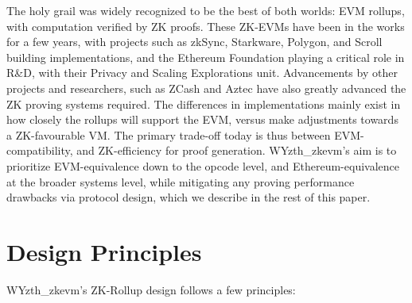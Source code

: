 \documentclass[9pt,oneside]{amsart}
\begin{document}
\begin{multicols}{2}
The holy grail was widely recognized to be the best of both worlds: EVM rollups, with computation verified by ZK proofs. These ZK-EVMs have been in the works for a few years, with projects such as zkSync, Starkware, Polygon, and Scroll building implementations, and the Ethereum Foundation playing a critical role in R\&D, with their Privacy and Scaling Explorations unit\cite{pse}. Advancements by other projects and researchers, such as ZCash and Aztec have also greatly advanced the ZK proving systems required. The differences in implementations mainly exist in how closely the rollups will support the EVM, versus make adjustments towards a ZK-favourable VM. The primary trade-off today is thus between EVM-compatibility, and ZK-efficiency for proof generation. WYzth_zkevm’s aim is to prioritize EVM-equivalence down to the opcode level, and Ethereum-equivalence at the broader systems level, while mitigating any proving performance drawbacks via protocol design, which we describe in the rest of this paper. 

\section{Design Principles}

WYzth_zkevm's ZK-Rollup design follows a few principles:


\end{multicols}
\end{document}
